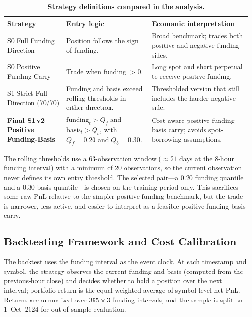 \documentclass[10pt,twocolumn,a4paper]{article}
\begin{document}
\begin{table}[t!]
  \centering
  \caption{\textbf{Strategy definitions compared in the analysis.}}
  \label{tab:s2-strats}
  \begin{tabular}{>{\raggedright\arraybackslash}p{}
                  >{\raggedright\arraybackslash}p{}
                  >{\raggedright\arraybackslash}p{}}
    \toprule
    \textbf{Strategy} & \textbf{Entry logic} & \textbf{Economic interpretation} \\
    \midrule
    S0 Full Funding Direction & Position follows the sign of funding. &
      Broad benchmark; trades both positive and negative funding sides. \\
    S0 Positive Funding Carry & Trade when funding $>0$. &
      Long spot and short perpetual to receive positive funding. \\
    S1 Strict Full Direction (70/70) & Funding and basis exceed rolling
      thresholds in either direction. &
      Thresholded version that still includes the harder negative side. \\
    \textbf{Final S1\,v2 Positive Funding-Basis} &
      $\text{funding}_t > Q_f$ and $\text{basis}_t > Q_b$, with
      $Q_f=0.20$ and $Q_b=0.30$. &
      Cost-aware positive funding-basis carry; avoids spot-borrowing
      assumptions. \\
    \bottomrule
  \end{tabular}
\end{table}

The rolling thresholds use a 63-observation window ($\approx 21$ days at
the 8-hour funding interval) with a minimum of 20 observations, so the
current observation never defines its own entry threshold.  The selected
pair---a $0.20$ funding quantile and a $0.30$ basis quantile---is chosen on
the training period only.  This sacrifices some raw PnL relative to the
simpler positive-funding benchmark, but the trade is narrower, less
active, and easier to interpret as a feasible positive funding-basis
carry.

\subsection{Backtesting Framework and Cost Calibration}

The backtest uses the funding interval as the event clock.  At each
timestamp and symbol, the strategy observes the current funding and basis
(computed from the previous-hour close) and decides whether to hold a
position over the next interval; portfolio return is the equal-weighted
average of symbol-level net PnL.  Returns are annualised over
$365\times 3$ funding intervals, and the sample is split on 1~Oct~2024 for
out-of-sample evaluation.
\end{document}
